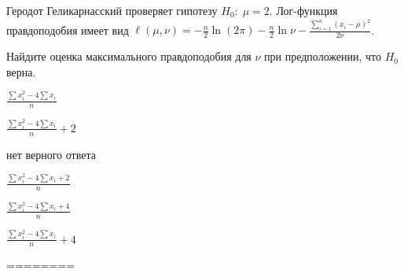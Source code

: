 
\begin{question}
Геродот Геликарнасский проверяет гипотезу \(H_0: \; \mu=2\). Лог-функция
правдоподобия имеет вид
\(\ell(\mu,\nu)=-\frac{n}{2}\ln (2\pi)-\frac{n}{2}\ln \nu -\frac{\sum_{i=1}^n(x_i-\mu)^2}{2\nu}\).

Найдите оценка максимального правдоподобия для \(\nu\) при
предположении, что \(H_0\) верна.
\begin{answerlist}
  \item \(\frac{\sum x_i^2 - 4\sum x_i}{n}\)
  \item \(\frac{\sum x_i^2 - 4\sum x_i}{n}+2\)
  \item нет верного ответа
  \item \(\frac{\sum x_i^2 - 4\sum x_i+2}{n}\)
  \item \(\frac{\sum x_i^2 - 4\sum x_i+4}{n}\)
  \item \(\frac{\sum x_i^2 - 4\sum x_i}{n}+4\)
\end{answerlist}
\end{question}

\begin{solution}
========
\end{solution}

